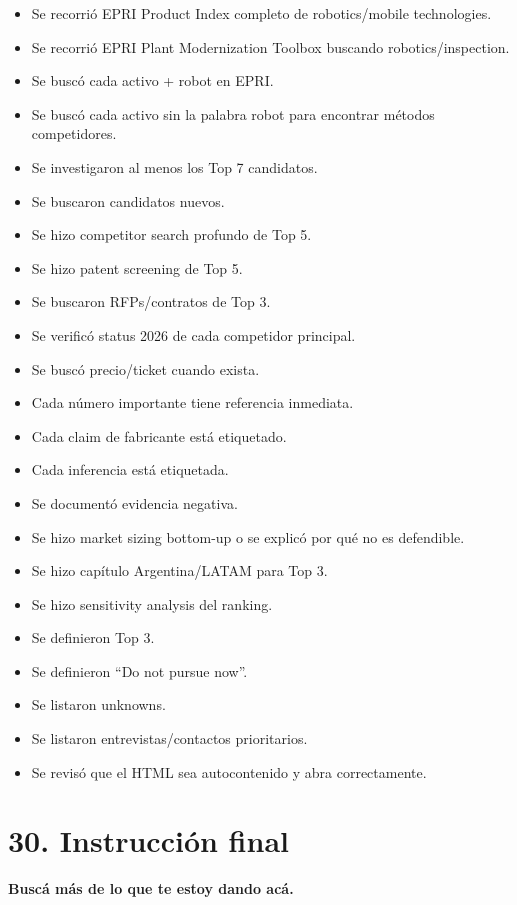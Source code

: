 \documentclass[11pt,a4paper]{article}
\begin{document}
\begin{itemize}[label=$\square$,leftmargin=1.6em]
\item Se recorrió EPRI Product Index completo de robotics/mobile technologies.
\item Se recorrió EPRI Plant Modernization Toolbox buscando robotics/inspection.
\item Se buscó cada activo + robot en EPRI.
\item Se buscó cada activo sin la palabra robot para encontrar métodos competidores.
\item Se investigaron al menos los Top 7 candidatos.
\item Se buscaron candidatos nuevos.
\item Se hizo competitor search profundo de Top 5.
\item Se hizo patent screening de Top 5.
\item Se buscaron RFPs/contratos de Top 3.
\item Se verificó status 2026 de cada competidor principal.
\item Se buscó precio/ticket cuando exista.
\item Cada número importante tiene referencia inmediata.
\item Cada claim de fabricante está etiquetado.
\item Cada inferencia está etiquetada.
\item Se documentó evidencia negativa.
\item Se hizo market sizing bottom-up o se explicó por qué no es defendible.
\item Se hizo capítulo Argentina/LATAM para Top 3.
\item Se hizo sensitivity analysis del ranking.
\item Se definieron Top 3.
\item Se definieron ``Do not pursue now''.
\item Se listaron unknowns.
\item Se listaron entrevistas/contactos prioritarios.
\item Se revisó que el HTML sea autocontenido y abra correctamente.
\end{itemize}


\section*{30. Instrucción final}
\textbf{Buscá más de lo que te estoy dando acá.}
\end{document}
